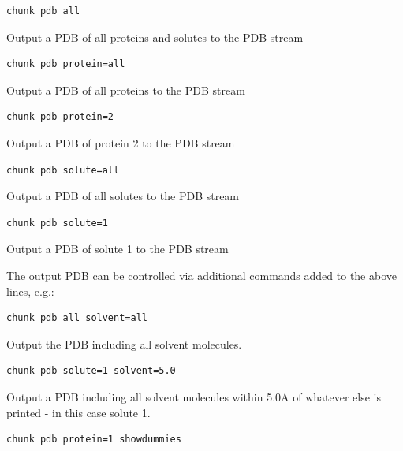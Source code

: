 \documentclass[letterpaper,10pt,english]{sphinxmanual}
\begin{document}
\begin{Verbatim}[commandchars=\\\{\}]
chunk pdb all
\end{Verbatim}

Output a PDB of all proteins and solutes to the PDB stream

\begin{Verbatim}[commandchars=\\\{\}]
chunk pdb protein=all
\end{Verbatim}

Output a PDB of all proteins to the PDB stream

\begin{Verbatim}[commandchars=\\\{\}]
chunk pdb protein=2
\end{Verbatim}

Output a PDB of protein 2 to the PDB stream

\begin{Verbatim}[commandchars=\\\{\}]
chunk pdb solute=all
\end{Verbatim}

Output a PDB of all solutes to the PDB stream

\begin{Verbatim}[commandchars=\\\{\}]
chunk pdb solute=1
\end{Verbatim}

Output a PDB of solute 1 to the PDB stream

The output PDB can be controlled via additional commands added to the above lines, e.g.:

\begin{Verbatim}[commandchars=\\\{\}]
chunk pdb all solvent=all
\end{Verbatim}

Output the PDB including all solvent molecules.

\begin{Verbatim}[commandchars=\\\{\}]
chunk pdb solute=1 solvent=5.0
\end{Verbatim}

Output a PDB including all solvent molecules within 5.0A of whatever else is printed - in this case solute 1.

\begin{Verbatim}[commandchars=\\\{\}]
chunk pdb protein=1 showdummies
\end{Verbatim}
\end{document}
